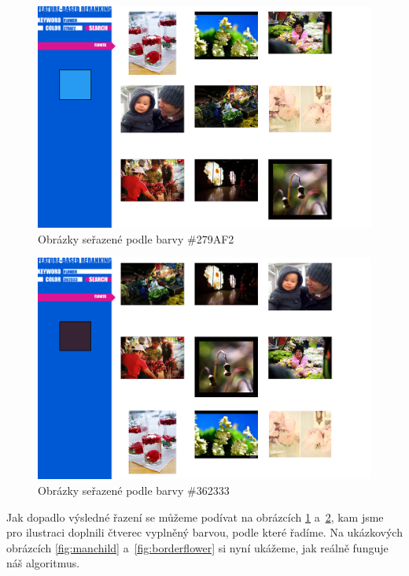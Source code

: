 \documentclass[12pt,oneside,a4paper]{article}
\begin{document}
\begin{figure} \begin{center}
\includegraphics[width=13.5cm]{figs/col01-flower-279af2-withcolor.png} \caption{Obrázky seřazené podle barvy \#279AF2}
\label{fig:279af2}
\end{center} \end{figure}
\begin{figure} \begin{center}
\includegraphics[width=13.5cm]{figs/col01-flower-362333-withcolor.png} \caption{Obrázky seřazené podle barvy \#362333}
\label{fig:362333}
\end{center} \end{figure}

Jak dopadlo výsledné řazení se můžeme podívat na obrázcích \ref{fig:279af2} a~\ref{fig:362333}, kam jsme pro ilustraci doplnili čtverec vyplněný barvou, podle které řadíme. Na ukázkových obrázcích \ref{fig:manchild} a~\ref{fig:borderflower} si nyní ukážeme, jak reálně funguje náš algoritmus.
\end{document}
